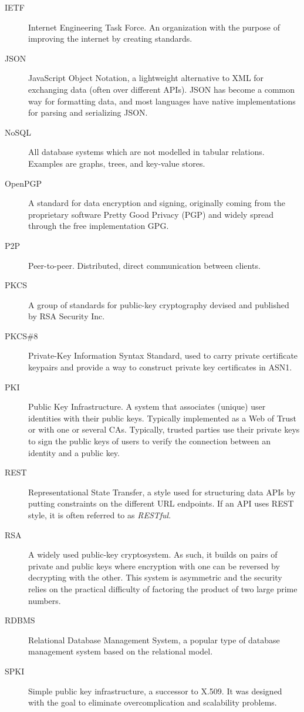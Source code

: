 \begin{description}
  \item[IETF] Internet Engineering Task Force. An organization with the purpose of improving the internet by creating standards. 
  \item[JSON] JavaScript Object Notation, a lightweight alternative to XML for exchanging data (often over different APIs). JSON has become a common way for formatting data, and most languages have native implementations for parsing and serializing JSON.
  \item[NoSQL] All database systems which are not modelled in tabular relations. Examples are graphs, trees, and key-value stores.
  \item[OpenPGP] A standard for data encryption and signing, originally coming from the proprietary software Pretty Good Privacy (PGP) and widely spread through the free implementation GPG.
  \item[P2P] Peer-to-peer. Distributed, direct communication between clients.
  \item[PKCS] A group of standards for public-key cryptography devised and published by RSA Security Inc.
  \item[PKCS\#8] Private-Key Information Syntax Standard, used to carry private certificate keypairs and provide a way to construct private key certificates in ASN1.
  \item[PKI] Public Key Infrastructure. A system that associates (unique) user identities with their public keys. Typically implemented as a Web of Trust or with one or several CAs. Typically, trusted parties use their private keys to sign the public keys of users to verify the connection between an identity and a public key.
  \item[REST] Representational State Transfer, a style used for structuring data APIs by putting constraints on the different URL endpoints. If an API uses REST style, it is often referred to as \emph{RESTful}.
  \item[RSA] A widely used public-key cryptosystem. As such, it builds on pairs of private and public keys where encryption with one can be reversed by decrypting with the other. This system is asymmetric and the security relies on the practical difficulty of factoring the product of two large prime numbers.
  \item[RDBMS] Relational Database Management System, a popular type of database management system based on the relational model.
  \item[SPKI] Simple public key infrastructure, a successor to X.509. It was designed with the goal to eliminate overcomplication and scalability problems.

\end{description}

